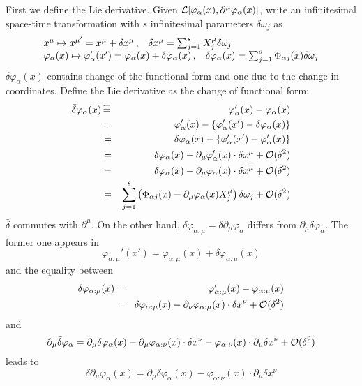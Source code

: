 First we define the Lie derivative.
Given ${\cal L}[\varphi_\alpha(x), \partial^\mu\varphi_\alpha(x)]$,
write an
infinitesimal space-time transformation with $s$ infinitesimal parameters $\delta \omega_j$ as
\begin{equation}
\begin{array}{l}
x^\mu \mapsto x^{\mu '} = x^\mu + \delta x^\mu\,,
\hspace{3mm}
\delta x^\mu = \sum_{j=1}^s X_j^\mu \delta \omega_j
\\
\varphi_\alpha (x) \mapsto \varphi_\alpha' (x')
=
\varphi_\alpha(x) + \delta \varphi_\alpha(x)\,,
\hspace{3mm}
\delta \varphi_\alpha(x) =
\sum_{j=1}^s \Phi_{\alpha j} (x) \delta \omega_j
\end{array}
\label{eqn:APNoeth_infsimtransf}
\end{equation}
$\delta \varphi_\alpha(x)$ contains change of 
the functional form and one due to the change in coordinates.
Define the Lie derivative as the change of functional form:
\begin{eqnarray}
\bar{\delta} \varphi_\alpha (x)
&\,\mbox{$\stackrel{\leftarrow}{=}$}\,&
\varphi_\alpha'(x) - \varphi_\alpha(x)
\nonumber\\
&=&
\varphi_\alpha'(x) - \{ \varphi_\alpha'(x') - \delta \varphi_\alpha(x) \}
\nonumber\\
&=&
\delta \varphi_\alpha(x) - \{ \varphi_\alpha'(x') - \varphi_\alpha'(x) \}
\nonumber\\
&=&
\delta \varphi_\alpha(x) -  \partial_\mu \varphi_\alpha'(x)\cdot \delta x^\mu + {\cal O}(\delta^2)
\nonumber\\
&=&
\delta \varphi_\alpha(x) -  \partial_\mu \varphi_\alpha(x)\cdot \delta x^\mu + {\cal O}(\delta^2)
\label{eqn:relLieanddelta}
\\
&=&
\sum_{j = 1}^s \left(
\Phi_{\alpha j} (x) - \partial_\mu \varphi_\alpha(x) X_j^\mu \right)
\delta \omega_j
+ {\cal O}(\delta^2)
\end{eqnarray}
$\bar{\delta}$ commutes with $\partial^\mu$.
On the other hand, $\delta \varphi_{\alpha : \mu} = \delta \partial_\mu \varphi_\alpha$
differs from $\partial_\mu \delta \varphi_\alpha$.
The former one appears in
\[
\varphi_{\alpha : \mu}' (x') = \varphi_{\alpha : \mu} (x) + \delta \varphi_{\alpha : \mu} (x)
\]
and the equality between
\begin{eqnarray*}
\bar{\delta} \varphi_{\alpha : \mu} (x)
&=&
\varphi_{\alpha : \mu}' (x) - \varphi_{\alpha : \mu} (x)
\\
&=&
\delta \varphi_{\alpha : \mu} (x)
-
 \partial_\nu \varphi_{\alpha:\mu}(x)\cdot \delta x^\nu + {\cal O}(\delta^2)
\end{eqnarray*}
and
\begin{equation*}
\partial_\mu \bar{\delta} \varphi_{\alpha}
=
\partial_\mu \delta \varphi_\alpha(x) -  \partial_\mu \varphi_{\alpha: \nu} (x)\cdot \delta x^\nu 
 -  \varphi_{\alpha: \nu} (x)\cdot \partial_\mu \delta x^\nu 
+ {\cal O}(\delta^2)
\end{equation*}
leads to
\begin{equation}
\delta \partial_\mu \varphi_{\alpha} (x)
=
\partial_\mu \delta \varphi_\alpha(x)
 -  \varphi_{\alpha: \nu} (x)\cdot \partial_\mu \delta x^\nu 
\end{equation}

